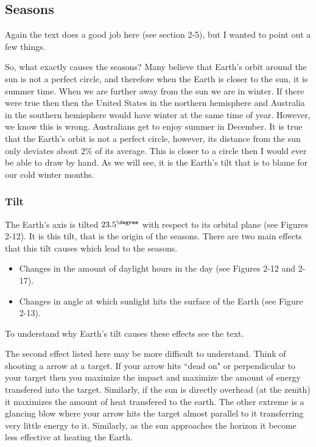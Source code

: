 \subsection*{Seasons}
Again the text does a good job here (see section 2-5), but I wanted to point out a few things. 

So, what exactly causes the seasons? Many believe that Earth's orbit around the sun is not a perfect circle, and therefore when the Earth is closer to the sun, it is summer time. When we are further away from the sun we are in winter. If there were true then then the United States in the northern hemisphere and Australia in the southern hemisphere would have winter at the same time of year. However, we know this is wrong. Australians get to enjoy summer in December. It is true that the Earth's orbit is not a perfect circle, however, its distance from the sun only deviates about $ 2\% $ of its average. This is closer to a circle then I would ever be able to draw by hand. As we will see, it is the Earth's tilt that is to blame for our cold winter months.

\subsubsection*{Tilt}

The Earth's axis is tilted $23.5^\degree$ with respect to its orbital plane (see Figures 2-12).
It is this tilt, that is the origin of the seasons. There are two main effects that this tilt causes which lead to the seasons.
\begin{itemize}
\item Changes in the amount of daylight hours in the day (see Figures 2-12 and 2-17).
\item Changes in angle at which sunlight hits the surface of the Earth (see Figure 2-13).
\end{itemize}
To understand why Earth's tilt causes these effects see the text.

The second effect listed here may be more difficult to understand. Think of shooting a arrow at a target. If your arrow hits ``dead on" or perpendicular to your target then you maximize the impact and maximize the amount of energy transfered into the target. Similarly, if the sun is directly overhead (at the zenith) it maximizes the amount of heat transfered to the earth. The other extreme is a glancing blow where your arrow hits the target almost parallel to it transferring very little energy to it. Similarly, as the sun approaches the horizon it become less effective at heating the Earth.

